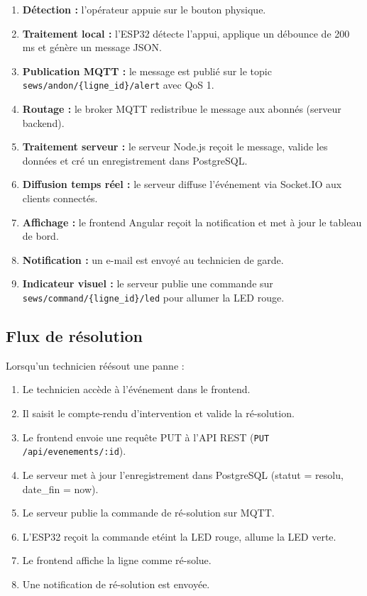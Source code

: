 \begin{enumerate}
    \item \textbf{D\'etection :} l'op\'erateur appuie sur le bouton physique.
    \item \textbf{Traitement local :} l'ESP32 d\'etecte l'appui, applique un d\'ebounce de 200 ms et g\'en\`ere un message JSON.
    \item \textbf{Publication MQTT :} le message est publi\'e sur le topic \texttt{sews/andon/\{ligne\_id\}/alert} avec QoS 1.
    \item \textbf{Routage :} le broker MQTT redistribue le message aux abonn\'es (serveur backend).
    \item \textbf{Traitement serveur :} le serveur Node.js re\c{c}oit le message, valide les donn\'ees et cr\'e un enregistrement dans PostgreSQL.
    \item \textbf{Diffusion temps r\'eel :} le serveur diffuse l'\'ev\'enement via Socket.IO aux clients connect\'es.
    \item \textbf{Affichage :} le frontend Angular re\c{c}oit la notification et met \`a jour le tableau de bord.
    \item \textbf{Notification :} un e-mail est envoy\'e au technicien de garde.
    \item \textbf{Indicateur visuel :} le serveur publie une commande sur \texttt{sews/command/\{ligne\_id\}/led} pour allumer la LED rouge.
\end{enumerate}

\subsection{Flux de r\'esolution}

Lorsqu'un technicien r\'e\'esout une panne :

\begin{enumerate}
    \item Le technicien acc\`ede \`a l'\'ev\'enement dans le frontend.
    \item Il saisit le compte-rendu d'intervention et valide la r\'e-solution.
    \item Le frontend envoie une requ\^ete PUT \`a l'API REST (\texttt{PUT /api/evenements/:id}).
    \item Le serveur met \`a jour l'enregistrement dans PostgreSQL (statut = resolu, date\_fin = now).
    \item Le serveur publie la commande de r\'e-solution sur MQTT.
    \item L'ESP32 re\c{c}oit la commande et\'eint la LED rouge, allume la LED verte.
    \item Le frontend affiche la ligne comme r\'e-solue.
    \item Une notification de r\'e-solution est envoy\'ee.
\end{enumerate}

